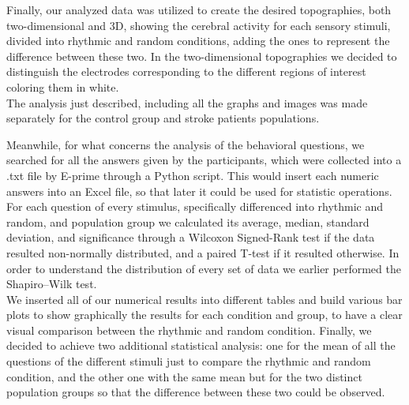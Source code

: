 Finally, our analyzed data was utilized to create the desired topographies, both two-dimensional and 3D, showing the cerebral activity for each sensory stimuli, divided into rhythmic and random conditions, adding the ones to represent the difference between these two. In the two-dimensional topographies we decided to distinguish the electrodes corresponding to the different regions of interest coloring them in white.\\
The analysis just described, including all the graphs and images was made separately for the control group and stroke patients populations. 

Meanwhile, for what concerns the analysis of the behavioral questions, we searched for all the answers given by the participants, which were collected into a .txt file by E-prime through a Python script. This would insert each numeric answers into an Excel file, so that later it could be used for statistic operations. \\
For each question of every stimulus, specifically differenced into rhythmic and random, and population group we calculated its average, median, standard deviation, and significance through a Wilcoxon Signed-Rank test if the data resulted non-normally distributed, and a paired T-test if it resulted otherwise. In order to understand the distribution of every set of data we earlier performed the Shapiro–Wilk test. \\
We inserted all of our numerical results into different tables and build various bar plots to show graphically the results for each condition and group, to have a clear visual comparison between the rhythmic and random condition. Finally, we decided to achieve two additional statistical analysis: one for the mean of all the questions of the different stimuli just to compare the rhythmic and random condition, and the other one with the same mean but for the two distinct population groups so that the difference between these two could be observed. 

